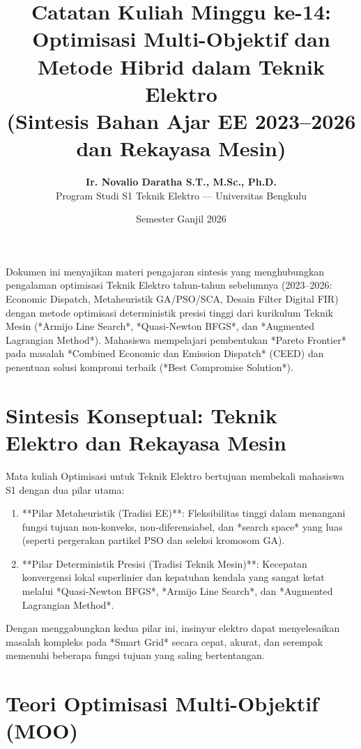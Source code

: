\documentclass[11pt,a4paper]{article}
\title{\textbf{Catatan Kuliah Minggu ke-14:}\\Optimisasi Multi-Objektif dan Metode Hibrid dalam Teknik Elektro\\(Sintesis Bahan Ajar EE 2023--2026 dan Rekayasa Mesin)}
\author{\textbf{Ir. Novalio Daratha S.T., M.Sc., Ph.D.}\\Program Studi S1 Teknik Elektro --- Universitas Bengkulu}
\date{Semester Ganjil 2026}
\begin{document}
\maketitle

\begin{tcolorbox}[colback=unibblue!5,colframe=unibblue,title=\textbf{Ringkasan Eksekutif dan Integrasi Kurikulum}]
Dokumen ini menyajikan materi pengajaran sintesis yang menghubungkan pengalaman optimisasi Teknik Elektro tahun-tahun sebelumnya (2023--2026: Economic Dispatch, Metaheuristik GA/PSO/SCA, Desain Filter Digital FIR) dengan metode optimisasi deterministik presisi tinggi dari kurikulum Teknik Mesin (*Armijo Line Search*, *Quasi-Newton BFGS*, dan *Augmented Lagrangian Method*). Mahasiswa mempelajari pembentukan *Pareto Frontier* pada masalah *Combined Economic dan Emission Dispatch* (CEED) dan penentuan solusi kompromi terbaik (*Best Compromise Solution*).
\end{tcolorbox}

\tableofcontents
\newpage

\section{Sintesis Konseptual: Teknik Elektro dan Rekayasa Mesin}
Mata kuliah Optimisasi untuk Teknik Elektro bertujuan membekali mahasiswa S1 dengan dua pilar utama:
\begin{enumerate}
    \item **Pilar Metaheuristik (Tradisi EE)**: Fleksibilitas tinggi dalam menangani fungsi tujuan non-konveks, non-diferensiabel, dan *search space* yang luas (seperti pergerakan partikel PSO dan seleksi kromosom GA).
    \item **Pilar Deterministik Presisi (Tradisi Teknik Mesin)**: Kecepatan konvergensi lokal superlinier dan kepatuhan kendala yang sangat ketat melalui *Quasi-Newton BFGS*, *Armijo Line Search*, dan *Augmented Lagrangian Method*.
\end{enumerate}

Dengan menggabungkan kedua pilar ini, insinyur elektro dapat menyelesaikan masalah kompleks pada *Smart Grid* secara cepat, akurat, dan serempak memenuhi beberapa fungsi tujuan yang saling bertentangan.

\section{Teori Optimisasi Multi-Objektif (MOO)}
\end{document}
